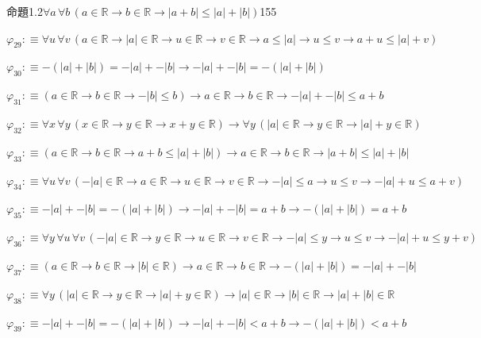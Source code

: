 \begin{fullproof}{命題1.2}{$\forall a\,\forall b\,(a \in \mathbb{R} \to b \in \mathbb{R} \to \lvert a + b \rvert \leq \lvert a \rvert + \lvert b \rvert)$}{155}
\begin{abbrevlist}
\item $\varphi_{29} :\equiv \forall u\,\forall v\,(a \in \mathbb{R} \to \lvert a \rvert \in \mathbb{R} \to u \in \mathbb{R} \to v \in \mathbb{R} \to a \leq \lvert a \rvert \to u \leq v \to a + u \leq \lvert a \rvert + v)$
\item $\varphi_{30} :\equiv -(\lvert a \rvert + \lvert b \rvert) = -\lvert a \rvert + -\lvert b \rvert \to -\lvert a \rvert + -\lvert b \rvert = -(\lvert a \rvert + \lvert b \rvert)$
\item $\varphi_{31} :\equiv (a \in \mathbb{R} \to b \in \mathbb{R} \to -\lvert b \rvert \leq b) \to a \in \mathbb{R} \to b \in \mathbb{R} \to -\lvert a \rvert + -\lvert b \rvert \leq a + b$
\item $\varphi_{32} :\equiv \forall x\,\forall y\,(x \in \mathbb{R} \to y \in \mathbb{R} \to x + y \in \mathbb{R}) \to \forall y\,(\lvert a \rvert \in \mathbb{R} \to y \in \mathbb{R} \to \lvert a \rvert + y \in \mathbb{R})$
\item $\varphi_{33} :\equiv (a \in \mathbb{R} \to b \in \mathbb{R} \to a + b \leq \lvert a \rvert + \lvert b \rvert) \to a \in \mathbb{R} \to b \in \mathbb{R} \to \lvert a + b \rvert \leq \lvert a \rvert + \lvert b \rvert$
\item $\varphi_{34} :\equiv \forall u\,\forall v\,(-\lvert a \rvert \in \mathbb{R} \to a \in \mathbb{R} \to u \in \mathbb{R} \to v \in \mathbb{R} \to -\lvert a \rvert \leq a \to u \leq v \to -\lvert a \rvert + u \leq a + v)$
\item $\varphi_{35} :\equiv -\lvert a \rvert + -\lvert b \rvert = -(\lvert a \rvert + \lvert b \rvert) \to -\lvert a \rvert + -\lvert b \rvert = a + b \to -(\lvert a \rvert + \lvert b \rvert) = a + b$
\item $\varphi_{36} :\equiv \forall y\,\forall u\,\forall v\,(-\lvert a \rvert \in \mathbb{R} \to y \in \mathbb{R} \to u \in \mathbb{R} \to v \in \mathbb{R} \to -\lvert a \rvert \leq y \to u \leq v \to -\lvert a \rvert + u \leq y + v)$
\item $\varphi_{37} :\equiv (a \in \mathbb{R} \to b \in \mathbb{R} \to \lvert b \rvert \in \mathbb{R}) \to a \in \mathbb{R} \to b \in \mathbb{R} \to -(\lvert a \rvert + \lvert b \rvert) = -\lvert a \rvert + -\lvert b \rvert$
\item $\varphi_{38} :\equiv \forall y\,(\lvert a \rvert \in \mathbb{R} \to y \in \mathbb{R} \to \lvert a \rvert + y \in \mathbb{R}) \to \lvert a \rvert \in \mathbb{R} \to \lvert b \rvert \in \mathbb{R} \to \lvert a \rvert + \lvert b \rvert \in \mathbb{R}$
\item $\varphi_{39} :\equiv -\lvert a \rvert + -\lvert b \rvert = -(\lvert a \rvert + \lvert b \rvert) \to -\lvert a \rvert + -\lvert b \rvert < a + b \to -(\lvert a \rvert + \lvert b \rvert) < a + b$

\end{abbrevlist}
\end{fullproof}
